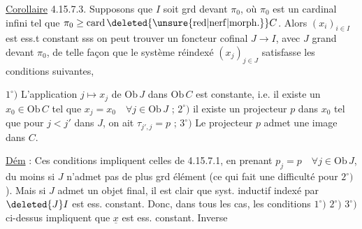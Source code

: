 
\uline{Corollaire} 4.15.7.3. Supposons que $I$ soit grd devant $\pi_0$, où $\pi_0$ est un cardinal infini tel que $\pi_0\geq\operatorname{card}\deleted{\unsure{\mathrm{red}|\mathrm{nerf}|\mathrm{morph.}}} C$. Alors $(x_i)_{i\in I}$ est ess.t constant sss on peut trouver un foncteur cofinal $J\longrightarrow I$, avec $J$  grand devant $\pi_0$, de telle façon que le système réindexé $(x_j)_{j\in J}$ satisfasse les conditions suivantes, 


 $1^\circ)$ L'application $j\mapsto x_j$ de $\mathrm{Ob}\,J$ dans $\mathrm{Ob}\,C$ est constante, i.e. il existe un $x_0\in\mathrm{Ob}\,C$ tel que $x_j=x_0\quad\forall j\in\mathrm{Ob}\,J$ ; $2^\circ)$ il existe un projecteur $p$ dans $x_0$ tel que pour $j<j'$ dans $J$, on ait $\tau_{j',j}=p$ ; $3^\circ)$ Le projecteur $p$ admet une image dans $C$.

\uline{Dém} : Ces conditions impliquent  celles de 4.15.7.1, en prenant $p_j=p\quad\forall j\in\mathrm{Ob}\,J$, du moins si $J$ n'admet pas de plus grd élément (ce qui fait une difficulté pour $2^\circ)$). Mais si $J$ admet un objet final,  il est clair  que  syst. inductif indexé par $\deleted{J}I$  est ess. constant. Donc, dans  tous les cas, les conditions $1^\circ)$ $2^\circ)$ $3^\circ)$ ci-dessus impliquent que $\underline{x}$ est ess. constant. Inverse%
